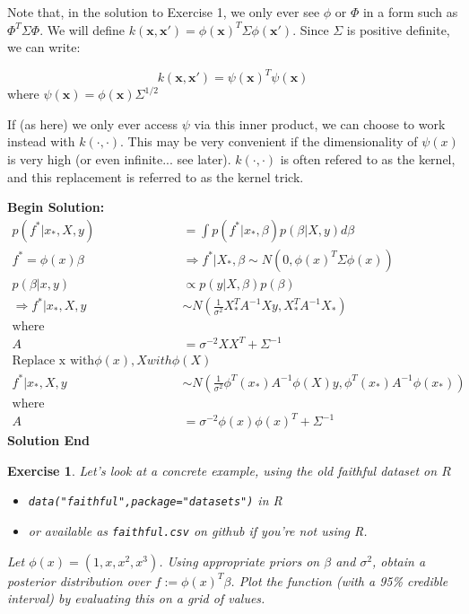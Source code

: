 \documentclass[twoside]{article}
\newcounter{lecnum}
\newtheorem{exercise}{Exercise}[lecnum]
\begin{document}
Note that, in the solution to Exercise 1, we only ever see $\phi$ or $\Phi$ in a form such as $\Phi^T\Sigma\Phi$. We will define $k(\mathbf{x},\mathbf{x}') = \phi(\mathbf{x})^T\Sigma\phi(\mathbf{x}')$. Since $\Sigma$ is positive definite, we can write:

$$k(\mathbf{x},\mathbf{x}') = \psi(\mathbf{x})^T\psi(\mathbf{x})$$
where $\psi(\mathbf{x}) = \phi(\mathbf{x})\Sigma^{1/2}$

If (as here) we only ever access $\psi$ via this inner product, we can choose to work instead with $k(\cdot,\cdot)$. This may be very convenient if the dimensionality of $\psi(x)$ is very high (or even infinite... see later). $k(\cdot,\cdot)$ is often refered to as the kernel, and this replacement is referred to as the kernel trick.

\textbf{Begin Solution:}
\begin{equation*}
\begin{split}
p(f^*|x_*,X,y) &= \int p(f^*|x_*,\beta) p(\beta|X,y) d\beta\\
f^* = \phi(x)\beta &\Rightarrow f^*|X_*,\beta \sim N(0,\phi(x)^T\Sigma\phi(x))\\
p(\beta|x,y)&\propto p(y|X,\beta)p(\beta)\\
\Rightarrow f^*|x_*,X,y &\sim N(\frac{1}{\sigma^2}X_*^TA^{-1}Xy,X_*^TA^{-1}X_*)\\
\text{where}\\
A &= \sigma^{-2}XX^T+\Sigma^{-1}\\
\text{Replace x with} \phi(x),X with \phi(X)\\
f^*|x_*,X,y &\sim N(\frac{1}{\sigma^2}\phi^T(x_*)A^{-1}\phi(X)y,\phi^T(x_*)A^{-1}\phi(x_*))\\
\text{where}\\
A &= \sigma^{-2}\phi(x)\phi(x)^T+\Sigma^{-1}
\end{split}
\end{equation*}
\textbf{Solution End}

\begin{exercise}

  Let's look at a concrete example, using the old faithful dataset on $R$
  \begin{itemize}
  \item \texttt{data("faithful",package="datasets")} in R
  \item or available as \texttt{faithful.csv} on github if you're not using R.
  \end{itemize}

  Let $\phi(x) = (1,x,x^2,x^3)$. Using appropriate priors on $\beta$ and $\sigma^2$, obtain a posterior distribution over $f:=\phi(x)^T\beta$. Plot the function (with a 95\% credible interval) by evaluating this on a grid of values.
\end{exercise}
  
\end{document}
